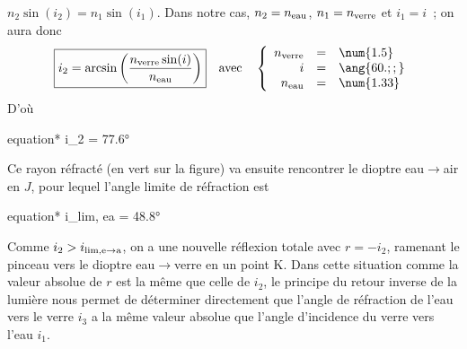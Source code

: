 \documentclass[../../main/main.tex]{subfiles}
\begin{document}
{\begin{enumerate}
		      $n_2\sin(i_2) = n_1\sin(i_1)$. Dans notre cas, $n_2 = n_{\rm eau}$,
		      $n_1 = n_{\rm verre}$ et $i_1 = i$~; on aura donc
		      \[
			      \boxed{i_2 = \arcsin \left(
				      \frac{n_{\rm verre}\sin(i)}{n_{\rm eau}}
				      \right)}
			      \quad\text{avec}\quad
			      \left\{
			      \begin{array}{rcl}
				      n_{\rm verre} & = & \num{1.5}   \\
				      i             & = & \ang{60.;;} \\
				      n_{\rm eau}   & = & \num{1.33}
			      \end{array}
			      \right.
		      \]
		      D'où
		      \begin{empheq}[box=\fbox]{equation*}
			      i_2 = \ang{77.6;;}
		      \end{empheq}
		      Ce rayon réfracté (en vert sur la figure) va ensuite rencontrer le
		      dioptre eau$\rightarrow$air en $J$, pour lequel l'angle limite de
		      réfraction est
		      \begin{empheq}[box=\fbox]{equation*}
			      i_{\rm lim, e\rightarrow a} = \ang{48.8;;}
		      \end{empheq}
		      Comme $i_2 > i_{\rm lim, e\rightarrow a}$, on a une nouvelle réflexion
		      totale avec $r=-i_2$, ramenant le pinceau vers le dioptre
		      eau$\rightarrow$verre en un point K. Dans cette situation comme la
		      valeur absolue de $r$ est la même que celle de $i_2$, le principe
		      du retour inverse de la lumière nous permet de déterminer directement
		      que l'angle de réfraction de l'eau vers le verre $i_3$ a la même valeur
		      absolue que l'angle d'incidence du verre vers l'eau $i_1$.\bigbreak


\end{enumerate}}
\end{document}
